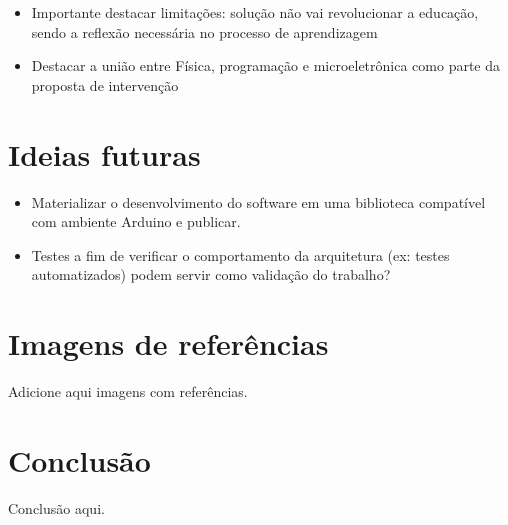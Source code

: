 \documentclass{article}
\begin{document}
\begin{itemize}
\begin{itemize}
\begin{itemize}
			\item Por outro lado, a inserção do Arduino associado aos sensores se torna um grande aliado aos cursos de física experimental nos diversos níveis de ensino. \cite{newton}
		\end{itemize}
		\item Importante destacar limitações: solução não vai revolucionar a educação, sendo a reflexão necessária no processo de aprendizagem \cite{newton}
		\item Destacar a união entre Física, programação e microeletrônica como parte da proposta de intervenção \cite{newton}
	\end{itemize}
\end{itemize}

\section{Ideias futuras}
\begin{itemize}
	\item Materializar o desenvolvimento do software em uma biblioteca compatível com ambiente Arduino e publicar.
	\item Testes a fim de verificar o comportamento da arquitetura (ex: testes automatizados) podem servir como validação do trabalho?
\end{itemize}

\section{Imagens de referências}
Adicione aqui imagens com referências.

\section{Conclusão}
Conclusão aqui.



\end{document}
